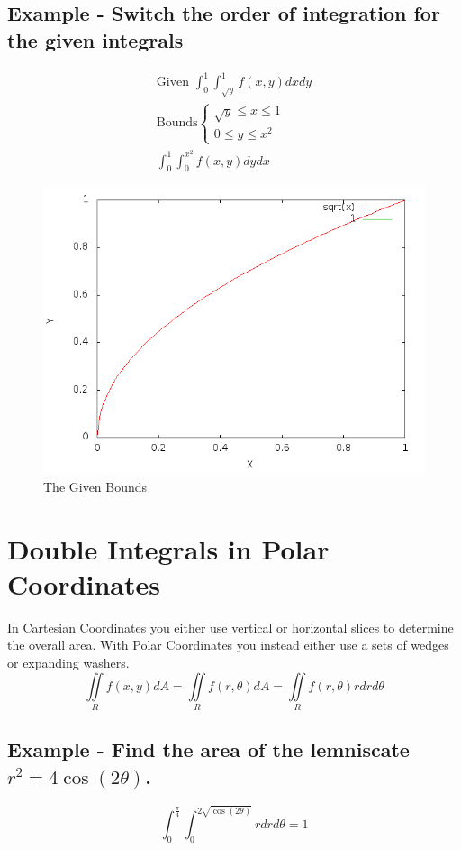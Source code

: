 \documentclass{article}
\begin{document}
    \subsection{Example - Switch the order of integration for the given integrals}
    \[
    \begin{aligned}
    \text{Given } \int_0^1 \int_{\sqrt{y} }^1 f(x,y) dxdy\\
    \text{Bounds}\begin{cases}
    \sqrt{y} \le x \le 1\\
    0 \le y \le x^2
    \end{cases}\\
    \int_0^1 \int_0^{x^2} f(x,y) dydx
    \end{aligned}
    \]
    \begin{figure}[ht]
    \centering
        \includegraphics[scale=0.25]{example.png}
    \caption{The Given Bounds}
    \end{figure}

\section{Double Integrals in Polar Coordinates}
In Cartesian Coordinates you either use vertical or horizontal slices to determine the overall area. With Polar Coordinates you instead either use a sets of wedges or expanding washers.
\[
\iint\limits_R f(x,y)dA = \iint\limits_R f(r, \theta) dA = \iint\limits_R f(r, \theta) rdrd\theta
\]
    \subsection{Example - Find the area of the lemniscate $r^2 = 4\cos(2\theta)$.}
    \[
    \int_0^{\frac{\pi}{4} } \int_0^{2 \sqrt{\cos(2\theta)} } rdrd\theta = 1
    \]
\end{document}
